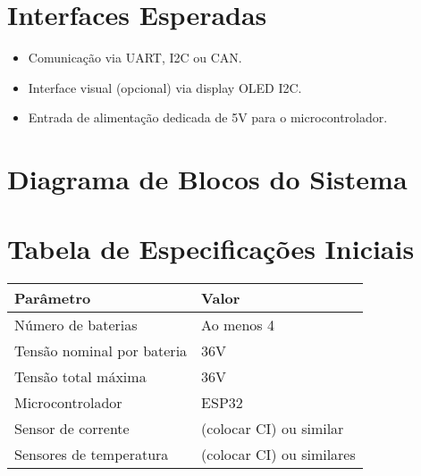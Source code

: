 \documentclass[12pt]{article}
\begin{document}
\section{Interfaces Esperadas}

\begin{itemize}
    \item Comunicação via UART, I2C ou CAN.
    \item Interface visual (opcional) via display OLED I2C.
    \item Entrada de alimentação dedicada de 5V para o microcontrolador.
\end{itemize}

\section{Diagrama de Blocos do Sistema}

\vspace{1cm}
\begin{center}
    \end{center}
\vspace{1cm}

\section{Tabela de Especificações Iniciais}

\begin{longtable}{|p{}|p{}|}
\hline
\textbf{Parâmetro} & \textbf{Valor} \\
\hline
Número de baterias & Ao menos 4 \\
\hline
Tensão nominal por bateria & 36V \\
\hline
Tensão total máxima & 36V \\
\hline
Microcontrolador & ESP32 \\
\hline
Sensor de corrente & (colocar CI) ou similar \\
\hline
Sensores de temperatura & (colocar CI) ou similares \\
\hline
\end{longtable}
\end{document}
